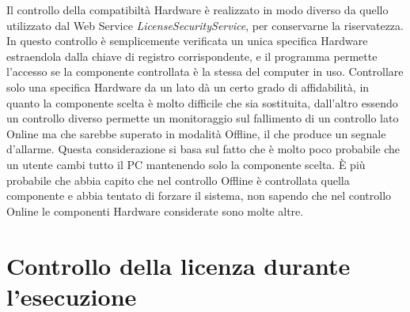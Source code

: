 Il controllo della compatibiltà Hardware è realizzato in modo diverso da quello utilizzato dal Web Service \textit{LicenseSecurityService}, per conservarne la riservatezza. In questo controllo è semplicemente verificata un unica specifica Hardware estraendola dalla chiave di registro corrispondente, e il programma permette l'accesso se la componente controllata è la stessa del computer in uso. Controllare solo una specifica Hardware da un lato dà un certo grado di affidabilità, in quanto la componente scelta è molto difficile che sia sostituita, dall'altro essendo un controllo diverso permette un monitoraggio sul fallimento di un controllo lato Online ma che sarebbe superato in modalità Offline, il che produce un segnale d'allarme. Questa considerazione si basa sul fatto che è molto poco probabile che un utente cambi tutto il PC mantenendo solo la componente scelta. È più probabile che abbia capito che nel controllo Offline è controllata quella componente e abbia tentato di forzare il sistema, non sapendo che nel controllo Online le componenti Hardware considerate sono molte altre.


\section{Controllo della licenza durante l'esecuzione}
\label{uniqueid}

